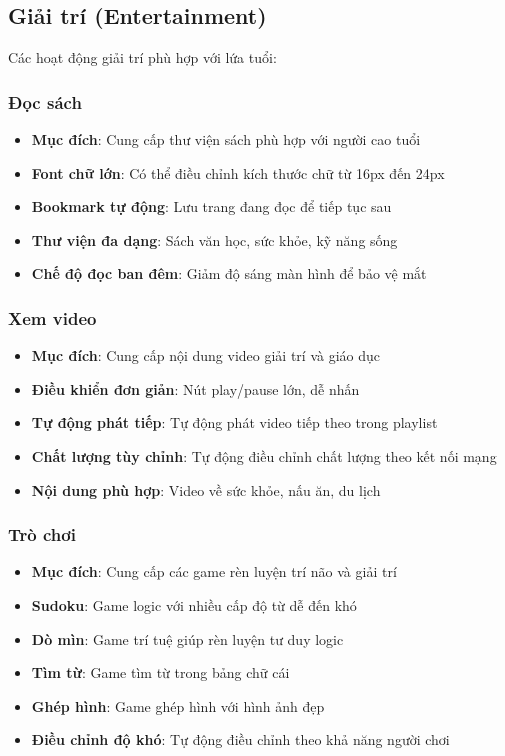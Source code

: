 \documentclass[12pt,a4paper]{article}
\begin{document}
\subsection{Giải trí (Entertainment)}
Các hoạt động giải trí phù hợp với lứa tuổi:

\subsubsection{Đọc sách}
\begin{itemize}[leftmargin=2cm]
    \item \textbf{Mục đích}: Cung cấp thư viện sách phù hợp với người cao tuổi
    \item \textbf{Font chữ lớn}: Có thể điều chỉnh kích thước chữ từ 16px đến 24px
    \item \textbf{Bookmark tự động}: Lưu trang đang đọc để tiếp tục sau
    \item \textbf{Thư viện đa dạng}: Sách văn học, sức khỏe, kỹ năng sống
    \item \textbf{Chế độ đọc ban đêm}: Giảm độ sáng màn hình để bảo vệ mắt
\end{itemize}

\subsubsection{Xem video}
\begin{itemize}[leftmargin=2cm]
    \item \textbf{Mục đích}: Cung cấp nội dung video giải trí và giáo dục
    \item \textbf{Điều khiển đơn giản}: Nút play/pause lớn, dễ nhấn
    \item \textbf{Tự động phát tiếp}: Tự động phát video tiếp theo trong playlist
    \item \textbf{Chất lượng tùy chỉnh}: Tự động điều chỉnh chất lượng theo kết nối mạng
    \item \textbf{Nội dung phù hợp}: Video về sức khỏe, nấu ăn, du lịch
\end{itemize}

\subsubsection{Trò chơi}
\begin{itemize}[leftmargin=2cm]
    \item \textbf{Mục đích}: Cung cấp các game rèn luyện trí não và giải trí
    \item \textbf{Sudoku}: Game logic với nhiều cấp độ từ dễ đến khó
    \item \textbf{Dò mìn}: Game trí tuệ giúp rèn luyện tư duy logic
    \item \textbf{Tìm từ}: Game tìm từ trong bảng chữ cái
    \item \textbf{Ghép hình}: Game ghép hình với hình ảnh đẹp
    \item \textbf{Điều chỉnh độ khó}: Tự động điều chỉnh theo khả năng người chơi
\end{itemize}
\end{document}
